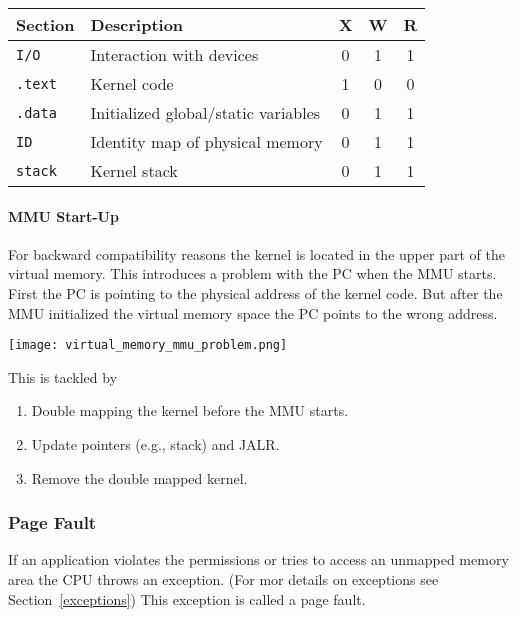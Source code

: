\renewcommand{\arraystretch}{1.3}
\setlength{\oldtabcolsep}{\tabcolsep}\setlength\tabcolsep{6pt}

\begin{tabularx}{\linewidth}{@{}lXccc@{}}
    Section        & Description                         & X & W & R \\
    \midrule
    \texttt{I/O}   & Interaction with devices            & 0 & 1 & 1 \\
    \texttt{.text} & Kernel code                         & 1 & 0 & 0 \\
    \texttt{.data} & Initialized global/static variables & 0 & 1 & 1 \\
    \texttt{ID}    & Identity map of physical memory     & 0 & 1 & 1 \\
    \texttt{stack} & Kernel stack                        & 0 & 1 & 1
\end{tabularx}

\renewcommand{\arraystretch}{1}
\setlength\tabcolsep{\oldtabcolsep}

\paragraph{MMU Start-Up}

For backward compatibility reasons the kernel is located in the upper part of the virtual memory. This introduces a problem with the PC when the MMU starts. First the PC is pointing to the physical address of the kernel code. But after the MMU initialized the virtual memory space the PC points to the wrong address.

\begin{center}
    \texttt{[image: virtual\_memory\_mmu\_problem.png]}
\end{center}

This is tackled by
\begin{enumerate}
    \item Double mapping the kernel before the MMU starts.
    \item Update pointers (e.g., stack) and JALR.\
    \item Remove the double mapped kernel.
\end{enumerate}

\subsubsection{Page Fault}
If an application violates the permissions or tries to access an unmapped memory area the CPU throws an exception. (For mor details on exceptions see Section~\ref{exceptions}) This exception is called a page fault.

